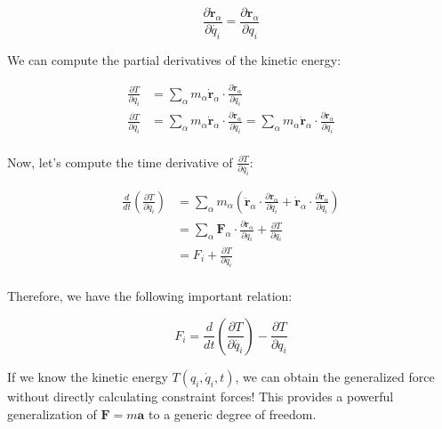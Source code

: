 \begin{equation}
    \frac{\partial \dot{\mathbf{r}}_\alpha}{\partial \dot{q_i}} = \frac{\partial \mathbf{r}_\alpha}{\partial q_i}
\end{equation}

We can compute the partial derivatives of the kinetic energy:

\begin{align}
    \frac {\partial T}{\partial q_i}       & = \sum_\alpha m_\alpha \dot{\mathbf{r}}_\alpha \cdot \frac{\partial \dot{\mathbf{r}}_\alpha}{\partial q_i}                                                                                                            \\
    \frac {\partial T}{\partial \dot{q_i}} & = \sum_\alpha m_\alpha \dot{\mathbf{r}}_\alpha \cdot \frac{\partial \dot{\mathbf{r}}_\alpha}{\partial \dot{q_i}} = \sum_\alpha m_\alpha \dot{\mathbf{r}}_\alpha \cdot \frac{\partial \mathbf{r}_\alpha}{\partial q_i} \\
\end{align}

Now, let's compute the time derivative of $\frac {\partial T}{\partial \dot{q_i}}$:

\begin{align}
    \frac{d}{dt} \left(\frac {\partial T}{\partial \dot{q_i}}\right) & = \sum_\alpha m_\alpha \left(\ddot{\mathbf{r}}_\alpha \cdot \frac{\partial \mathbf{r}_\alpha}{\partial q_i} + \dot{\mathbf{r}}_\alpha \cdot \frac{\partial \dot{\mathbf{r}}_\alpha}{\partial q_i}\right) \\
                                                                     & = \sum_\alpha \mathbf{F}_\alpha \cdot \frac{\partial \mathbf{r}_\alpha}{\partial q_i} + \frac{\partial T}{\partial q_i}                                                                                  \\
                                                                     & = F_i + \frac{\partial T}{\partial q_i}                                                                                                                                                                  \\
\end{align}

Therefore, we have the following important relation:

\begin{equation}
    F_i = \frac{d}{dt} \left(\frac {\partial T}{\partial \dot{q_i}}\right) - \frac{\partial T}{\partial q_i}
\end{equation}

If we know the kinetic energy $T(q_i, \dot{q}_i, t)$, we can obtain the generalized force
without directly calculating constraint forces! This provides a powerful generalization
of $\mathbf{F} = m\mathbf{a}$ to a generic degree of freedom.